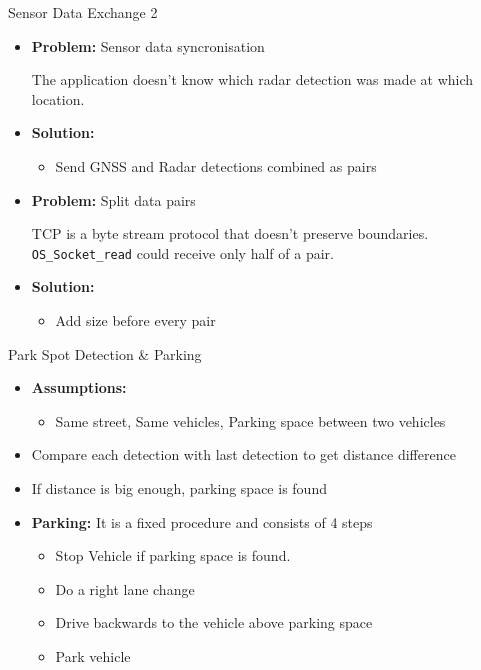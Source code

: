 \begin{frame}{Sensor Data Exchange 2}
\begin{itemize}

\item \textbf{Problem:} Sensor data syncronisation

The application doesn't know which radar detection was made at which location.

\item \textbf{Solution:} 
    \begin{itemize}
    \item Send GNSS and Radar detections combined as pairs
    \end{itemize}

\vspace{12pt} 
\item \textbf{Problem:} Split data pairs

TCP is a byte stream protocol that doesn't preserve boundaries. \texttt{OS\_Socket\_read} could receive only half of a pair.

\item \textbf{Solution:} 
    \begin{itemize}
    \item Add size before every pair
    \end{itemize}
 

\end{itemize}
\end{frame}

\begin{frame}{Park Spot Detection \& Parking}
\begin{itemize}


\item \textbf{Assumptions:} 
    \begin{itemize}
    \item Same street, Same vehicles, Parking space between two vehicles
    \end{itemize}
\vspace{12pt} 
\item Compare each detection with last detection to get distance difference
\item If distance is big enough, parking space is found
\vspace{12pt} 

\item \textbf{Parking:} It is a fixed procedure and consists of 4 steps
    \begin{itemize}
    \item Stop Vehicle if parking space is found.
    \item Do a right lane change
    \item Drive backwards to the vehicle above parking space
    \item Park vehicle

    

    \end{itemize}    

\end{itemize}
\end{frame}